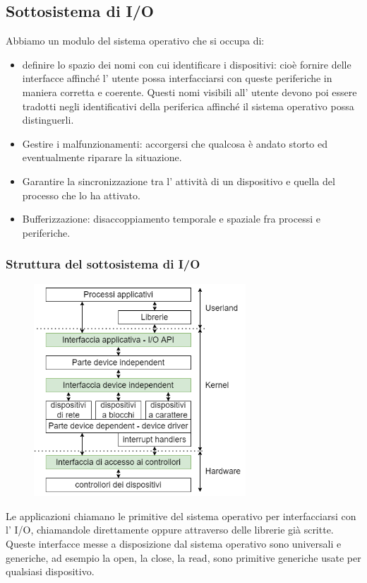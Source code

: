 \subsection{Sottosistema di I/O}
Abbiamo un modulo del sistema operativo che si occupa di:
\begin{itemize}
    \item definire lo spazio dei nomi con cui identificare i dispositivi: cioè fornire delle interfacce affinché l' utente possa interfacciarsi con queste periferiche in maniera corretta e coerente.
    Questi nomi visibili all' utente devono poi essere tradotti negli identificativi della periferica affinché il sistema operativo possa distinguerli.

    \item Gestire i malfunzionamenti: accorgersi che qualcosa è andato storto ed eventualmente riparare la situazione.
    
    \item Garantire la sincronizzazione tra l' attività di un dispositivo e quella del processo che lo ha attivato.
    
    \item Bufferizzazione: disaccoppiamento temporale e spaziale fra processi e periferiche.
\end{itemize}

\subsubsection{Struttura del sottosistema di I/O}
\begin{figure}[H]
    \centering
    \includegraphics[width=300px]{images/10_Gestione_delle_periferiche/io_subsystem.png}
\end{figure}
Le applicazioni chiamano le primitive del sistema operativo per interfacciarsi con l' I/O, chiamandole direttamente oppure attraverso delle librerie già scritte.
Queste interfacce messe a disposizione dal sistema operativo sono universali e generiche, ad esempio la open, la close, la read, sono primitive generiche usate per qualsiasi dispositivo.

